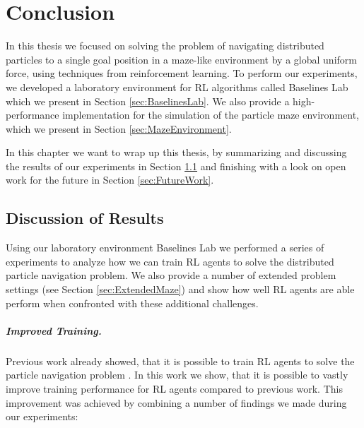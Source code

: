 \chapter{Conclusion}
In this thesis we focused on solving the problem of navigating distributed particles to a single goal position in a maze-like environment by a global uniform force, using techniques from reinforcement learning. To perform our experiments, we developed a laboratory environment for RL algorithms called Baselines Lab which we present in Section \ref{sec:BaselinesLab}. We also provide a high-performance implementation for the simulation of the particle maze environment, which we present in Section \ref{sec:MazeEnvironment}.  

In this chapter we want to wrap up this thesis, by summarizing and discussing the results of our experiments in Section \ref{sec:EvalDiscussion} and finishing with a look on open work for the future in Section \ref{sec:FutureWork}.

\section{Discussion of Results} \label{sec:EvalDiscussion}
Using our laboratory environment Baselines Lab we performed a series of experiments to analyze how we can train RL agents to solve the distributed particle navigation problem. We also provide a number of extended problem settings (see Section \ref{sec:ExtendedMaze}) and show how well RL agents are able perform when confronted with these additional challenges.

\paragraph{Improved Training.}
Previous work already showed, that it is possible to train RL agents to solve the particle navigation problem \cite{huang2019,becker2020}. In this work we show, that it is possible to vastly improve training performance for RL agents compared to previous work. This improvement was achieved by combining a number of findings we made during our experiments:

